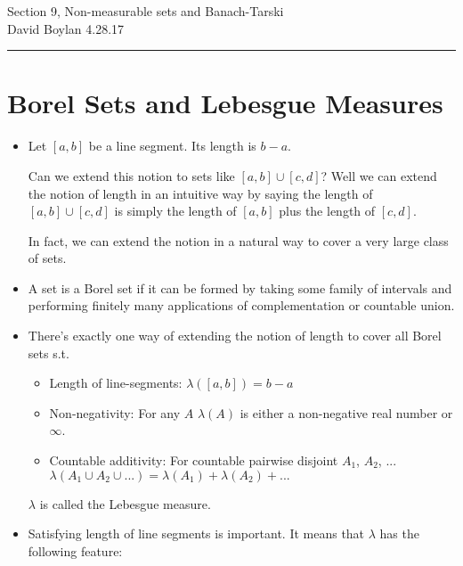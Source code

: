 \documentclass[justified]{tufte-handout}
\newcommand{\HRule}{\rule{\linewidth}{0.1mm}}
\begin{document}
\frenchspacing

\begin{fullwidth}
\noindent\Large Section 9, Non-measurable sets and Banach-Tarski \large \\[.3cm]
\noindent  David Boylan \hfill{4.28.17}

\noindent\HRule
\end{fullwidth}

\section{Borel Sets and Lebesgue Measures}

\begin{itemize}

\item Let $[a,b]$ be a line segment. Its length is $b-a$. 

Can we extend this notion to sets like $[a,b] \cup [c,d]$? Well we can extend the notion of length in an intuitive way by saying the length of  $[a,b] \cup [c,d]$ is simply the length of $[a,b]$ plus the length of $[c,d]$.

In fact, we can extend the notion in a natural way to cover a very large class of sets.

\item A set is a Borel set if it can be formed by taking some family of intervals and performing finitely many applications of complementation or countable union.


\item There's exactly one way of extending the notion of length to cover all Borel sets s.t.

\begin{itemize}

\item Length of line-segments: $\lambda([a,b]) = b-a$


\item Non-negativity: For any $A$ $\lambda(A)$ is either a non-negative real number or $\infty$.

\item Countable additivity: For countable pairwise disjoint $A_1$, $A_2$, ... $\lambda(A_1 \cup A_2\cup ...) = \lambda(A_1)+\lambda(A_2) +...$

\end{itemize}

$\lambda$ is called the Lebesgue measure.

\item Satisfying length of line segments  is important. It means that $\lambda$ has the following feature:


\end{itemize}
\end{document}
